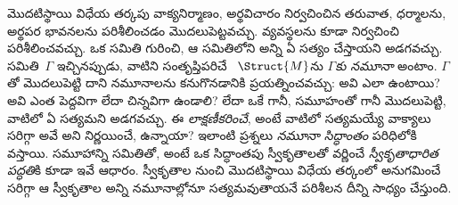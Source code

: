 \documentclass[../../../include/open-logic-section]{subfiles}
\begin{document}


మొదటిస్థాయి విధేయ తర్కపు వాక్యనిర్మాణం, అర్థవిచారం నిర్వచించిన తరువాత,
 ధర్మాలను, అర్థపర భావనలను పరిశీలించడం మొదలుపెట్టవచ్చు.
 వ్యవస్థలను కూడా నిర్వచించి పరిశీలించవచ్చు. ఒక
 సమితి గురించి, ఆ సమితిలోని అన్ని  ఏ
 సత్యం చేస్తాయని అడగవచ్చు. 
సమితి~$\Gamma$ ఇచ్చినప్పుడు, వాటిని సంతృప్తిపరిచే
~$\Struct{M}$ను \emph{$\Gamma$కు నమూనా} అంటాం.
$\Gamma$తో మొదలుపెట్టి దాని నమూనాలను కనుగొనడానికి ప్రయత్నించవచ్చు:
అవి ఎలా ఉంటాయి? అవి ఎంత పెద్దవిగా లేదా చిన్నవిగా ఉండాలి? లేదా ఒకే
 గానీ,  సమూహంతో గానీ మొదలుపెట్టి,
వాటిలో ఏ  సత్యమని అడగవచ్చు. ఈ 
\emph{లాక్షణీకరించే}, అంటే వాటిలో సత్యమయ్యే వాక్యాలు సరిగ్గా అవే అని
నిర్ణయించే,  ఉన్నాయా? ఇలాంటి ప్రశ్నలు \emph{నమూనా
సిద్ధాంతం} పరిధిలోకి వస్తాయి.  సమూహాన్ని
 సమితితో, అంటే ఒక సిద్ధాంతపు స్వీకృతాలతో వర్ణించే
\emph{స్వీకృతాధారిత పద్ధతి}కి కూడా ఇవే ఆధారం. స్వీకృతాల నుంచి
మొదటిస్థాయి విధేయ తర్కంలో అనుగమించే  సరిగ్గా ఆ స్వీకృతాల అన్ని
నమూనాల్లోనూ సత్యమవుతాయనే పరిశీలన దీన్ని సాధ్యం చేస్తుంది.
\end{document}
